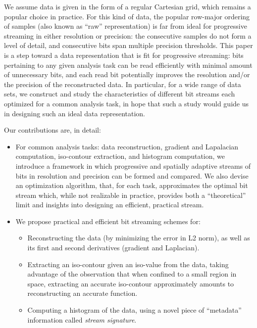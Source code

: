 We assume data is given in the form of a regular Cartesian grid, which remains a popular choice in practice. For this kind of data, the popular row-major ordering of samples (also known as ``raw'' representation) is far from ideal for progressive streaming in either resolution or precision: the consecutive samples do not form a level of detail, and consecutive bits span multiple precision thresholds. This paper is a step toward a data representation that is fit for progressive streaming: bits pertaining to any given analysis task can be read efficiently with minimal amount of unnecessary bits, and each read bit potentially improves the resolution and/or the precision of the reconstructed data. In particular, for a wide range of data sets, we construct and study the characteristics of different bit streams each optimized for a common analysis task, in hope that such a study would guide us in designing such an ideal data representation. 

Our contributions are, in detail:

\begin{itemize}
  \item For common analysis tasks: data reconstruction, gradient and Lapalacian computation, iso-contour extraction, and histogram computation, we introduce a framework in which progressive and spatially adaptive streams of bits in resolution and precision can be formed and compared. We also devise an optimization algorithm, that, for each task, approximates the optimal bit stream which, while not realizable in practice, provides both a ``theoretical'' limit and insights into designing an efficient, practical stream.
  \item We propose practical and efficient bit streaming schemes for:
  \begin{itemize}
    \item Reconstructing the data (by minimizing the error in L2 norm), as well as its first and second derivatives (gradient and Laplacian).
    \item Extracting an iso-contour given an iso-value from the data, taking advantage of the observation that when confined to a small region in space, extracting an accurate iso-contour approximately amounts to reconstructing an accurate function.
    \item Computing a histogram of the data, using a novel piece of ``metadata'' information called \emph{stream signature}.
  \end{itemize}
\end{itemize}
